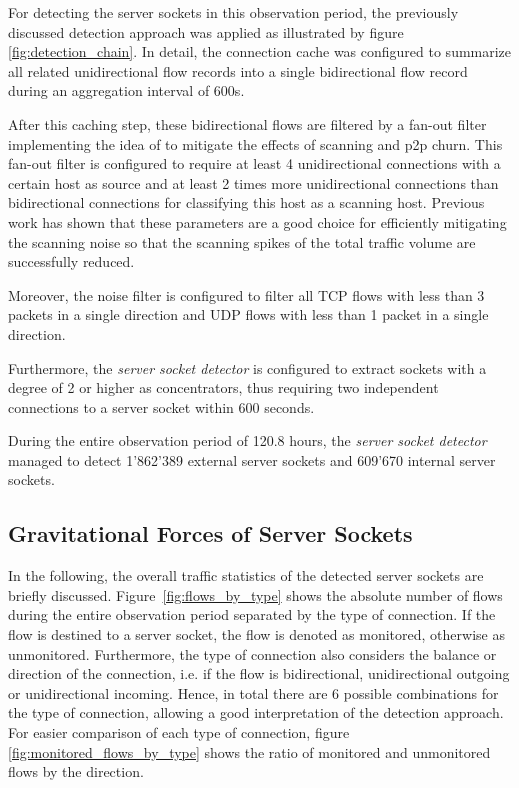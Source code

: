 For detecting the \glspl{server socket} in this observation period, the 
previously discussed detection approach was applied as illustrated by figure 
\ref{fig:detection_chain}. In detail, the connection cache was configured to 
summarize all related unidirectional flow records into a single bidirectional 
flow record during an aggregation interval of 600s. 

After this caching step, these bidirectional flows are filtered by a fan-out 
filter implementing the idea of \citet{Allman:2007} to mitigate the effects of 
scanning and \gls{p2p} churn. This fan-out filter is configured to require at 
least 4 unidirectional connections with a certain host as source and at least 2 
times more unidirectional connections than bidirectional connections for 
classifying this host as a scanning host. 
Previous work\citep{Schatzmann:Mining,Schatzmann:Dissection, Schatzmann:Tracing} 
has shown that these parameters are a good choice for efficiently mitigating the 
scanning noise so that the scanning spikes of the total traffic volume are 
successfully reduced.

Moreover, the noise filter is configured to filter all \gls{TCP} flows with less 
than 3 packets in a single direction and \gls{UDP} flows with less than 1 packet 
in a single direction. 

Furthermore, the \emph{server socket detector} is configured to extract sockets 
with a degree of 2 or higher as concentrators, thus requiring two independent 
connections to a \gls{server socket} within 600 seconds. 

During the entire observation period of 120.8 hours, the 
\emph{server socket detector} managed to detect 1'862'389 external 
\glspl{server socket} and 609'670 internal \glspl{server socket}.

\subsection{Gravitational Forces of Server Sockets}
In the following, the overall traffic statistics of the detected 
\glspl{server socket} are briefly discussed. Figure \ref{fig:flows_by_type} 
shows the absolute number of flows during the entire observation period 
separated by the type of connection. If the flow is destined to a 
\gls{server socket}, the flow is denoted as monitored, otherwise as unmonitored. 
Furthermore, the type of connection also considers the balance or direction of 
the connection, i.e. if the flow is bidirectional, unidirectional outgoing or 
unidirectional incoming. Hence, in total there are 6 possible combinations for 
the type of connection, allowing a good interpretation of the detection 
approach. For easier comparison of each type of connection, figure 
\ref{fig:monitored_flows_by_type} shows the ratio of monitored and unmonitored 
flows by the direction.

